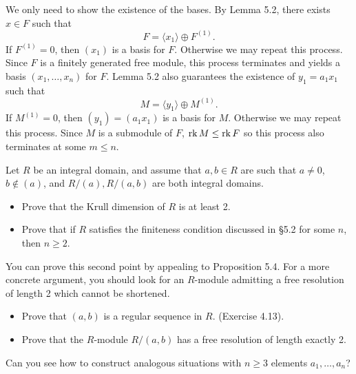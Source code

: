 \documentclass[../../master.tex]{subfiles}
\begin{document}
\begin{solution}
    We only need to show the existence of the bases.
    By Lemma 5.2, there exists $x \in F$ such that
    \[
        F = \langle x_1 \rangle \oplus F^{(1)}.
    \]
    If $F^{(1)} = 0$, then $(x_1)$ is a basis for $F$.
    Otherwise we may repeat this process.
    Since $F$ is a finitely generated free module, this process terminates and yields a basis $(x_1, \ldots, x_n)$ for $F$.
    Lemma 5.2 also guarantees the existence of $y_1 = a_1 x_1$ such that
    \[
        M = \langle y_1 \rangle \oplus M^{(1)}.
    \]
    If $M^{(1)} = 0$, then $(y_1) = (a_1 x_1)$ is a basis for $M$.
    Otherwise we may repeat this process.
    Since $M$ is a submodule of $F$, $\operatorname{rk} M \leq \operatorname{rk} F$ so this process also terminates at some $m \leq n$.
\end{solution}

\begin{problem}
    Let $R$ be an integral domain, and assume that $a, b \in R$ are such that $a \neq 0$, $b \notin (a)$, and $R/(a), R/(a, b)$ are both integral domains.
    \begin{itemize}
        \item Prove that the Krull dimension of $R$ is at least 2.
        \item Prove that if $R$ satisfies the finiteness condition discussed in \S 5.2 for some $n$, then $n \geq 2$.
    \end{itemize}
    You can prove this second point by appealing to Proposition 5.4.
    For a more concrete argument, you should look for an $R$-module admitting a free resolution of length 2 which cannot be shortened.
    \begin{itemize}
        \item Prove that $(a, b)$ is a regular sequence in $R$. (Exercise 4.13).
        \item Prove that the $R$-module $R/(a,b)$ has a free resolution of length exactly 2.
    \end{itemize}
    Can you see how to construct analogous situations with $n \geq 3$ elements $a_1, \ldots, a_n$?
\end{problem}
\end{document}
